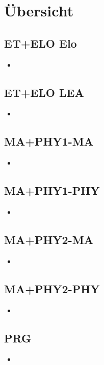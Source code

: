 
\section{Übersicht}

\subsection{ET+ELO Elo}
\begin{itemize}
  \item 
\end{itemize}

\subsection{ET+ELO LEA}
\begin{itemize}
  \item 
\end{itemize}

\subsection{MA+PHY1-MA}
\begin{itemize}
  \item 
\end{itemize}

\subsection{MA+PHY1-PHY}
\begin{itemize}
  \item 
\end{itemize}

\subsection{MA+PHY2-MA}
\begin{itemize}
  \item 
\end{itemize}

\subsection{MA+PHY2-PHY}
\begin{itemize}
  \item 
\end{itemize}

\subsection{PRG}
\begin{itemize}
  \item 
\end{itemize}
